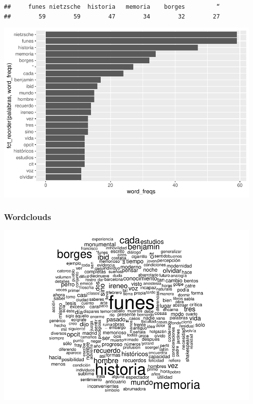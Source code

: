 \documentclass[
]{article}
\begin{document}
\begin{verbatim}
##     funes nietzsche  historia   memoria    borges         “ 
##        59        59        47        34        32        27
\end{verbatim}

\includegraphics{Mineria_de_Texto_files/figure-latex/unnamed-chunk-22-1.pdf}

\hypertarget{wordclouds}{%
\subsubsection{Wordclouds}\label{wordclouds}}

\includegraphics{Mineria_de_Texto_files/figure-latex/unnamed-chunk-23-1.pdf}
\end{document}
